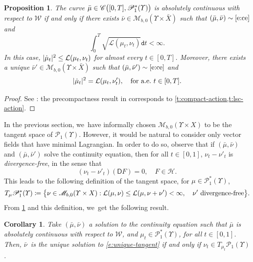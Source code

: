 \documentclass[10pt]{amsart}
\newtheorem{proposition}[theorem]{Proposition}
\newtheorem{corollary}[theorem]{Corollary}
\theoremstyle{definition}
\theoremstyle{remark}
\DeclarePairedDelimiter{\paren}{\lparen}{\rparen}
\DeclarePairedDelimiter{\set}{\lbrace}{\rbrace}
\DeclarePairedDelimiter{\abs}{\lvert}{\rvert}
\begin{document}
\begin{proposition}\label{t:wcurl-absolutely-continuous}
The curve $\bar{\mu} \in \mathscr{C}\paren[\big]{[0,T], \mathscr{P}^{*}_{1}(\varUpsilon)}$ is absolutely continuous with respect to $\mathcal{W}$ if and only if there exists $\bar{\nu} \in \mathscr{M}_{b,0}(\varUpsilon \times \bar{X})$ such that $(\bar{\mu}, \bar{\nu}) \sim \cref{e:ce}$ and
\begin{equation*}
\int_{0}^{T} \sqrt{\mathcal{L}(\mu_{t}, \nu_{t})} \mathtt{d} t < \infty.
\end{equation*}
In this case, $\abs{\dot{\mu}_{t}}^{2} \leq \mathcal{L}(\mu_{t}, \nu_{t})$ for almost every $t \in [0,T]$.
Moreover, there exists a unique $\bar{\nu}' \in \mathscr{M}_{b,0}(\varUpsilon \times \bar{X})$ such that $(\bar{\mu}, \bar{\nu}') \sim \cref{e:ce}$ and
\begin{equation}\label{e:unique-tangent}
\abs{\dot{\mu}_{t}}^{2} = \mathcal{L}(\mu_{t}, \nu'_{t}), \quad \text{for a.e.}\ t \in [0,T].
\end{equation}
\end{proposition}
\begin{proof}
See \cite[Th.\,5.17]{DNS09}: the precompactness result in \cite[Cor.\,4.10]{DNS09} corresponds to \cref{t:compact-action,t:lsc-action}.
\end{proof}

In the previous section, we~have informally chosen $\mathscr{M}_{b,0}(\varUpsilon \times X)$ to be the tangent space of $\mathscr{P}_{1}(\varUpsilon)$.
However, it would be natural to consider only vector fields that have minimal Lagrangian.
In order to do so, observe that if $(\bar{\mu}, \bar{\nu})$ and $(\bar{\mu}, \bar{\nu}')$ solve the continuity equation, then for all $t \in [0,1]$, $\nu_{t} - \nu'_{t}$ is \emph{divergence-free}, in the sense that
\begin{equation*}
(\nu_{t} - \nu'_{t})(\mathsf{D} F) = 0, \quad F \in \mathscr{H}.
\end{equation*}
This leads to the following definition of the tangent space, for $\mu \in \mathscr{P}_{1}^{*}(\varUpsilon)$,
\begin{equation*}
T_{\mu} \mathscr{P}^{*}_{1}(\varUpsilon) \coloneq \set[\big]{ \nu \in \mathscr{M}_{b,0}(\varUpsilon \times X) : \mathcal{L}(\mu, \nu) \leq \mathcal{L}(\mu, \nu + \nu') < \infty,\quad \nu' \ \text{divergence-free} }.
\end{equation*}
From \cref{t:wcurl-absolutely-continuous} and this definition, we~get the following result.
\begin{corollary}\label{t:nu-tangent}
Take $(\bar{\mu}, \bar{\nu})$ a solution to the continuity equation such that $\bar{\mu}$ is absolutely continuous with respect to $\mathcal{W}$, and $\mu_{t} \in \mathscr{P}_{1}^{*}(\varUpsilon)$, for all $t \in [0,1]$.
Then, $\bar{\nu}$~is the unique solution to \cref{e:unique-tangent} if and only if $\nu_{t} \in T_{\mu_{t}} \mathscr{P}_{1}(\varUpsilon)$.
\end{corollary}
\end{document}
